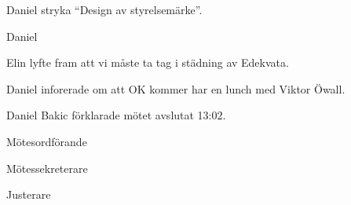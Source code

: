 \documentclass[10pt]{article}
\def\mo{Daniel Bakic}
\def\ms{Axel Voss}
\def\ji{Adam Belfrage}
\begin{document}
\begin{paragrafer}
		
	Daniel \ypa stryka ``Design av styrelsemärke''.
	
	\Mbaby
	
	Daniel 

	\Mbaby 


	Elin lyfte fram att vi måste ta tag i städning av Edekvata.

	Daniel inforerade om att OK kommer har en lunch med Viktor Öwall.

	{\mo} förklarade mötet avslutat 13:02.
\end{paragrafer}

\hidesignfoot
\begin{signatures}{3}
	\signature{\mo}{Mötesordförande}
	\signature{\ms}{Mötessekreterare}
	\signature{\ji}{Justerare}
\end{signatures}
\end{document}
